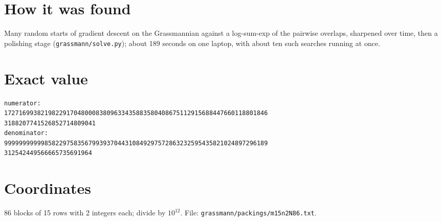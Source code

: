 \documentclass[11pt,a4paper]{article}
\begin{document}
\section{How it was found}
Many random starts of gradient descent on the Grassmannian against a log-sum-exp of the pairwise overlaps, sharpened over time, then a polishing stage (\texttt{grassmann/solve.py}); about 189 seconds on one laptop, with about ten such searches running at once.


\appendix
\section{Exact value}
{\small
\begin{verbatim}
numerator:
172716993821982291704800083809633435883580408675112915688447660118801846
3188207741526852714809041
denominator:
999999999998582297583567993937044310849297572863232595435821024897296189
312542449566665735691964
\end{verbatim}}

\section{Coordinates}
86 blocks of 15 rows with 2 integers each; divide by $10^{12}$. File: \texttt{grassmann/packings/m15n2N86.txt}.
{\tiny
\begin{multicols}{4}
\end{multicols}}
\end{document}
